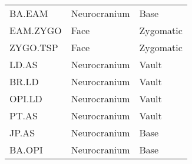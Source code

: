 \begin {table}[hp]
\begin {tabularx} {\textwidth} {X X X}
    BA.EAM & Neurocranium & Base \\
    EAM.ZYGO & Face & Zygomatic \\
    ZYGO.TSP & Face & Zygomatic \\
    LD.AS & Neurocranium & Vault \\
    BR.LD & Neurocranium & Vault \\
    OPI.LD & Neurocranium & Vault \\
    PT.AS & Neurocranium & Vault \\
    JP.AS & Neurocranium & Base \\
    BA.OPI & Neurocranium & Base \\
  \end {tabularx}
  \hr
\end {table} %